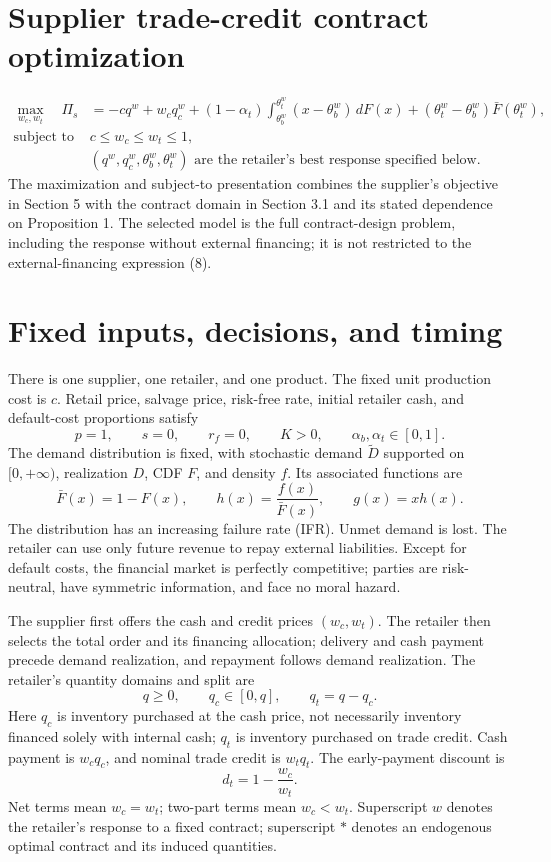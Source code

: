 \documentclass{article}
\begin{document}
\section*{Supplier trade-credit contract optimization}
\begin{equation}
\begin{aligned}
\max_{w_c,w_t}\quad \Pi_s
&=-cq^w+w_cq_c^w
 +(1-\alpha_t)\int_{\theta_b^w}^{\theta_t^w}(x-\theta_b^w)\,dF(x)
 +(\theta_t^w-\theta_b^w)\bar F(\theta_t^w),\\
\text{subject to}\quad &c\leq w_c\leq w_t\leq 1,\\
&(q^w,q_c^w,\theta_b^w,\theta_t^w)
 \text{ are the retailer's best response specified below.}
\end{aligned}\tag{7}
\end{equation}
The maximization and subject-to presentation combines the supplier's objective in Section 5 with the contract domain in Section 3.1 and its stated dependence on Proposition 1. The selected model is the full contract-design problem, including the response without external financing; it is not restricted to the external-financing expression (8).

\section*{Fixed inputs, decisions, and timing}
There is one supplier, one retailer, and one product. The fixed unit production cost is $c$. Retail price, salvage price, risk-free rate, initial retailer cash, and default-cost proportions satisfy
\[
p=1,\qquad s=0,\qquad r_f=0,\qquad K>0,\qquad
\alpha_b,\alpha_t\in[0,1].
\]
The demand distribution is fixed, with stochastic demand $\widetilde D$ supported on $[0,+\infty)$, realization $D$, CDF $F$, and density $f$. Its associated functions are
\[
\bar F(x)=1-F(x),\qquad h(x)=\frac{f(x)}{\bar F(x)},\qquad
 g(x)=xh(x).
\]
The distribution has an increasing failure rate (IFR). Unmet demand is lost. The retailer can use only future revenue to repay external liabilities. Except for default costs, the financial market is perfectly competitive; parties are risk-neutral, have symmetric information, and face no moral hazard.

The supplier first offers the cash and credit prices $(w_c,w_t)$. The retailer then selects the total order and its financing allocation; delivery and cash payment precede demand realization, and repayment follows demand realization. The retailer's quantity domains and split are
\[
q\geq0,\qquad q_c\in[0,q],\qquad q_t=q-q_c.
\]
Here $q_c$ is inventory purchased at the cash price, not necessarily inventory financed solely with internal cash; $q_t$ is inventory purchased on trade credit. Cash payment is $w_cq_c$, and nominal trade credit is $w_tq_t$. The early-payment discount is
\[
d_t=1-\frac{w_c}{w_t}.
\]
Net terms mean $w_c=w_t$; two-part terms mean $w_c<w_t$. Superscript $w$ denotes the retailer's response to a fixed contract; superscript $*$ denotes an endogenous optimal contract and its induced quantities.
\end{document}
